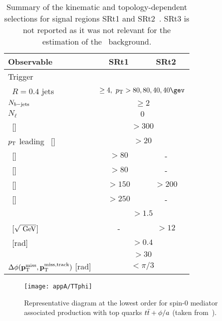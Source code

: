 		\begin{table}[!htb]
			\caption{Summary of the kinematic and topology-dependent selections for signal regions SRt1 and SRt2~\cite{DMhf}. SRt3 is not reported as it was not relevant for the estimation of the \ttZ\ background.}
			\centering
			\renewcommand{\arraystretch}{1.5}
				\begin{tabular}{lcc}
					\toprule
					\textbf{Observable}  & SRt1 & SRt2 \\
					\midrule
					Trigger             &   \multicolumn{2}{c}{\met}   \\
					\antikt\ $R=0.4$ jets  & \multicolumn{2}{c}{$\ge 4,~\pt>80,80,40,40 \gev$} \\
					$N_{b\mathrm{-jets}}$  & \multicolumn{2}{c}{$\geq2$} \\[0.3ex]
					$N_{\ell}$  & \multicolumn{2}{c}{$0$} \\[0.3ex]
					\midrule
					\met\ [\GeV]         &\multicolumn{2}{c}{$>300$}  \\
					$p_{\mathrm{T}}$ leading \bj\ [\GeV] &  \multicolumn{2}{c}{$>20$}   \\
					\midrule
					\mantikteightzero\ [\GeV] & $>80$ & -     \\
					\mantikteightone\ [\GeV] & $>80$ & -     \\
					\mtbmin\ [\GeV]           & $>150$ & $>200$ \\
					\mtbmax\ [\GeV]           & $>250$ & -      \\
					\drbb\    & \multicolumn{2}{c}{$>1.5$} \\
					\metsig\  [$\sqrt{\GeV}$] & - & $>12$ \\
					\midrule
					\dphimin\ [rad]     &  \multicolumn{2}{c}{$>0.4$} \\
					\mettrack [\GeV]   &  \multicolumn{2}{c}{$> 30$}  \\
					$\Delta\phi(\mathbf{p}_\mathrm{T}^\mathrm{miss},\mathbf{p}_{\mathrm{T}}^{\mathrm{miss, track}})$  [rad] & \multicolumn{2}{c}{$< \pi/3$} \\
					\bottomrule
				\end{tabular}
			\label{tab:srtselections}
		\end{table}

		\begin{wrapfigure}{R}{.33\textwidth}
			\centering\texttt{[image: appA/TTphi]}
			\caption{Representative diagram at the lowest order for spin-0 mediator associated production with top quarks $t\bar{t}+\phi/a$ (taken from~\cite{DMhf}).}
			\label{fig:dmhfModels}
		\end{wrapfigure}

